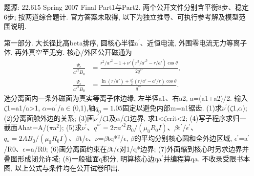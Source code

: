 题源: 22.615 Spring 2007 Final Part1与Part2. 两个公开文件分别含平衡8步、稳定6步; 按两道综合题计. 官方答案未取得, 以下为独立推导、可执行参考解及模型范围说明.
\begin{exercise}\label{ex:07-final-eq}
第一部分. 大长径比高beta排序, 圆核心半径a\ensuremath{{}^{\prime}}、近恒电流, 外围零电流无力等离子体, 再外真空至无穷. 核心/外区公开磁通为
\begin{align}
 \frac{\Psi_c}{a'^2B_0}&=\frac{r^2/a'^2-1+\nu'(r^3/a'^3-r/a')\cos\theta}{2q^{*\prime}},\\
 \frac{\Psi_o}{a'^2B_0}&=\frac{\ln(r/a')+\tfrac{\nu'}2(r/a'-a'/r)\cos\theta}{q^{*\prime}}.
\end{align}
选分离面内一条外磁面为真实等离子体边缘, 左半径a1、右a2, a=(a1+a2)/2. 输入\ensuremath{\zeta}1=a1/a>1, \ensuremath{\alpha}=a\ensuremath{{}^{\prime}}/a\ensuremath{\in}(0,1),轴$q_0=1.05$固定以避免内部m=n1锯齿. (1)求\ensuremath{\nu}\ensuremath{{}^{\prime}}(\ensuremath{\zeta}1,\ensuremath{\alpha}); (2)分离面触外边的关系; (3)画\ensuremath{\nu}\ensuremath{{}^{\prime}}/\ensuremath{\zeta}1及\ensuremath{\alpha}/\ensuremath{\zeta}1边界, 求1<\ensuremath{\zeta}crit<2; (4)写子程序求归一截面Ahat=A/(\ensuremath{\pi}a\ensuremath{{}^{2}}); (5)求\ensuremath{\nu}\ensuremath{{}^{\prime}}、$q^{*\prime}=2\pi a'^2B_0/(\mu_0R_0I)$、\ensuremath{\beta}t\ensuremath{{}^{\prime}}/\ensuremath{\epsilon}\ensuremath{{}^{\prime}}、$q_*=2AB_0/(\mu_0R_0I)$、\ensuremath{\beta}t/\ensuremath{\epsilon}、\ensuremath{\nu}=\ensuremath{\beta}tq*\ensuremath{{}^{2}}/\ensuremath{\epsilon}, \ensuremath{\beta}的平均分别核心圆和全外边区域, \ensuremath{\epsilon}\ensuremath{{}^{\prime}}=a\ensuremath{{}^{\prime}}/R0、\ensuremath{\epsilon}=a/R0; (6)画分离面约束在\ensuremath{\beta}t/\ensuremath{\epsilon}对1/q*边界; (7)外面缩到核心时另求边界并叠图形成闭允许域; (8)一般磁面q积分, 明算核心边qa\ensuremath{{}^{\prime}}并编程算qa. 不收录受限书本图, 以上公式与条件均在公开试卷印出.
\end{exercise}
